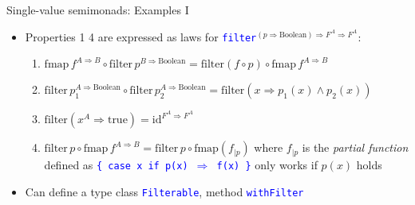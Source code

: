 \documentclass[english]{beamer}
\begin{document}
\begin{frame}{Single-value semimonads: Examples I}

\begin{itemize}
\item Properties 1 \textendash{} 4 are expressed as laws for \texttt{\textcolor{blue}{\footnotesize{}filter}}$^{(p\Rightarrow\text{Boolean})\Rightarrow F^{A}\Rightarrow F^{A}}$:
\begin{enumerate}
\item {\footnotesize{}$\text{fmap}\,f^{A\Rightarrow B}\circ\text{filter}\,p^{B\Rightarrow\text{Boolean}}=\text{filter}\left(f\circ p\right)\circ\text{fmap}\,f^{A\Rightarrow B}$}{\footnotesize \par}
\item {\footnotesize{}$\text{filter}\,p_{1}^{A\Rightarrow\text{Boolean}}\circ\text{filter}\,p_{2}^{A\Rightarrow\text{Boolean}}=\text{filter}\left(x\Rightarrow p_{1}(x)\wedge p_{2}(x)\right)$}{\footnotesize \par}
\item {\footnotesize{}$\text{filter}\left(x^{A}\Rightarrow\text{true}\right)=\text{id}^{F^{A}\Rightarrow F^{A}}$ }{\footnotesize \par}
\item {\footnotesize{}$\text{filter}\,p\circ\text{fmap}\,f^{A\Rightarrow B}=\text{filter}\,p\circ\text{fmap}\left(f_{|p}\right)$
}where {\footnotesize{}$f_{|p}$} is the \emph{partial function} defined
as \texttt{\textcolor{blue}{\footnotesize{}\{ case x if p(x) $\Rightarrow$
f(x) \}}} \textendash{} only works if $p(x)$ holds
\end{enumerate}
\item Can define a type class \texttt{\textcolor{blue}{\footnotesize{}Filterable}},
method \texttt{\textcolor{blue}{\footnotesize{}withFilter}} 
\end{itemize}
\end{frame}
\end{document}
